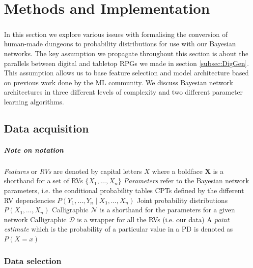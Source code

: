 \documentclass{UoYCSproject}
\begin{document}
\chapter{Methods and Implementation}

\paragraph{}
In this section we explore various issues with formalising the conversion of human-made dungeons to probability distributions for use with our Bayesian networks. The key assumption we propagate throughout this section is about the parallels between digital and tabletop RPGs we made in section \ref{subsec:DigGen}. This assumption allows us to base feature selection and model architecture based on previous work done by the ML community. We discuss Bayesian network architectures in three different levels of complexity and two different parameter learning algorithms.

\section{Data acquisition}

\paragraph{Note on notation}
\begin{outline}
  \1 \textit{Features} or \textit{RVs} are denoted by capital letters \(X\) where a boldface \(\boldsymbol{X}\) is a shorthand for a set of RVs \(\{X_1, \ldots, X_n\}\)
  \1 \textit{Parameters} refer to the Bayesian network parameters, i.e. the conditional probability tables CPTs defined by the different RV dependencies \(P(Y_1, \ldots, Y_n \mid X_1, \ldots , X_n)\)
  \1 Joint probability distributions \(P(X_1, \ldots , X_n)\)
  \1 Calligraphic \(\mathcal{N}\) is a shorthand for the parameters for a given network
  \1 Calligraphic \(\mathcal{D}\) is a wrapper for all the RVs (i.e. our data)
  \1 A \textit{point estimate} which is the probability of a particular value in a PD is denoted as \(P(X = x)\)
\end{outline}

\subsection{Data selection} %
\end{document}
